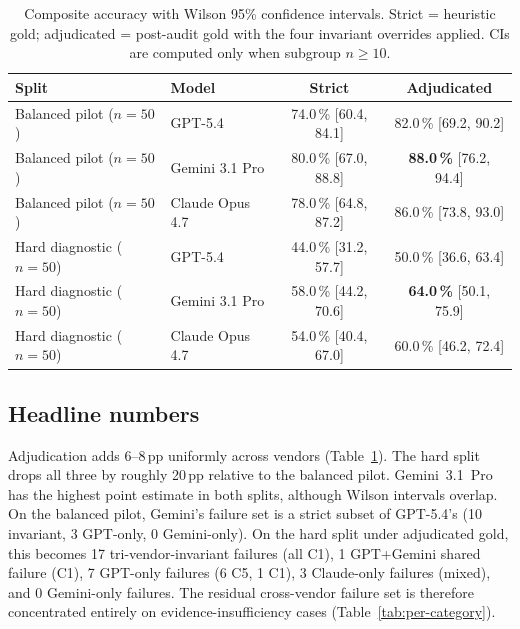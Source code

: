 \documentclass{article}
\begin{document}
\begin{table}[t]
\centering
\caption{Composite accuracy with Wilson 95\% confidence intervals. Strict =
heuristic gold; adjudicated = post-audit gold with the four invariant
overrides applied. CIs are computed only when subgroup $n \geq 10$.}
\label{tab:headline}
\small
\begin{tabular}{llcc}
\toprule
\textbf{Split} & \textbf{Model} & \textbf{Strict} & \textbf{Adjudicated} \\
\midrule
Balanced pilot ($n=50$)  & GPT-5.4         & 74.0\,\% [60.4, 84.1] & 82.0\,\% [69.2, 90.2] \\
Balanced pilot ($n=50$)  & Gemini 3.1 Pro  & 80.0\,\% [67.0, 88.8] & \textbf{88.0\,\%} [76.2, 94.4] \\
Balanced pilot ($n=50$)  & Claude Opus 4.7 & 78.0\,\% [64.8, 87.2] & 86.0\,\% [73.8, 93.0] \\
\midrule
Hard diagnostic ($n=50$) & GPT-5.4         & 44.0\,\% [31.2, 57.7] & 50.0\,\% [36.6, 63.4] \\
Hard diagnostic ($n=50$) & Gemini 3.1 Pro  & 58.0\,\% [44.2, 70.6] & \textbf{64.0\,\%} [50.1, 75.9] \\
Hard diagnostic ($n=50$) & Claude Opus 4.7 & 54.0\,\% [40.4, 67.0] & 60.0\,\% [46.2, 72.4] \\
\bottomrule
\end{tabular}
\end{table}

\subsection{Headline numbers}

Adjudication adds 6--8\,pp uniformly across vendors
(Table~\ref{tab:headline}). The hard split drops all three by roughly
20\,pp relative to the balanced pilot. Gemini~3.1~Pro has the highest
point estimate in both splits, although Wilson intervals overlap. On the balanced pilot, Gemini's
failure set is a strict subset of GPT-5.4's (10 invariant, 3 GPT-only,
0 Gemini-only). On the hard split under adjudicated gold, this becomes
17 tri-vendor-invariant failures (all C1), 1 GPT+Gemini shared failure
(C1), 7 GPT-only failures (6 C5, 1 C1), 3 Claude-only failures (mixed),
and 0 Gemini-only failures. The residual cross-vendor failure set is
therefore concentrated entirely on evidence-insufficiency cases
(Table~\ref{tab:per-category}).
\end{document}
